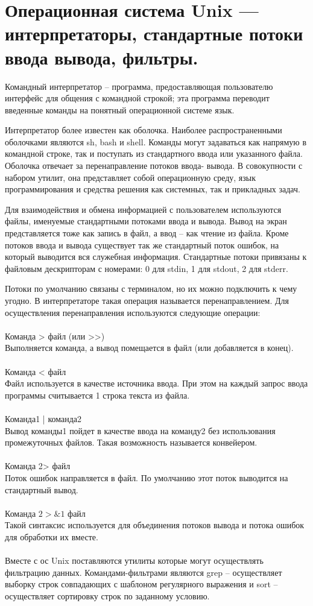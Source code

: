 \documentclass{article}
\begin{document}
\section{Операционная система Unix — интерпретаторы, стандартные потоки ввода вывода, фильтры.}
Командный интерпретатор – программа, предоставляющая пользователю интерфейс для общения с командной строкой; 
эта программа переводит введенные команды на понятный операционной системе язык.


Интерпретатор более известен как оболочка. Наиболее распространенными оболочками являются sh, bash и shell.
Команды могут задаваться как напрямую в командной строке, так и поступать из стандартного ввода или указанного файла. 
Оболочка отвечает за перенаправление потоков ввода- вывода. В совокупности с набором утилит, она представляет собой операционную среду, 
язык программирования и средства решения как системных, так и прикладных задач.


Для взаимодействия и обмена информацией с пользователем используются файлы, именуемые стандартными потоками ввода и вывода.
Вывод на экран представляется тоже как запись в файл, а ввод – как чтение из файла. Кроме потоков ввода и вывода существует так же стандартный поток ошибок, на который выводится вся служебная информация. 
Стандартные потоки привязаны к файловым дескрипторам с номерами:
0 для stdin, 1 для stdout, 2 для stderr.


Потоки по умолчанию связаны с терминалом, но их можно подключить к чему угодно. 
В интерпретаторе такая операция называется перенаправлением.
Для осуществления перенаправления используются следующие операции:\\
\\
Команда > файл (или >>)\\
Выполняется команда, а вывод помещается в файл (или добавляется в конец).\\
\\
Команда < файл\\
Файл используется в качестве источника ввода. При этом на каждый запрос ввода программы считывается 1 строка текста из файла.\\
\\
Команда1 | команда2\\
Вывод команды1 пойдет в качестве ввода на команду2 без использования промежуточных файлов. Такая возможность называется конвейером.
\\ \\
Команда 2> файл\\
Поток ошибок направляется в файл. По умолчанию этот поток выводится на стандартный вывод.
\\ \\
Команда $2>\&1$ файл\\
Такой синтаксис используется для объединения потоков вывода и потока ошибок для обработки их вместе.
\\ \\
Вместе с ос Unix поставляются утилиты которые могут осуществлять фильтрацию данных. 
Командами-фильтрами являются grep – осуществляет выборку строк совпадающих с шаблоном регулярного выражения и sort – осуществляет сортировку строк по заданному условию. 
\end{document}
